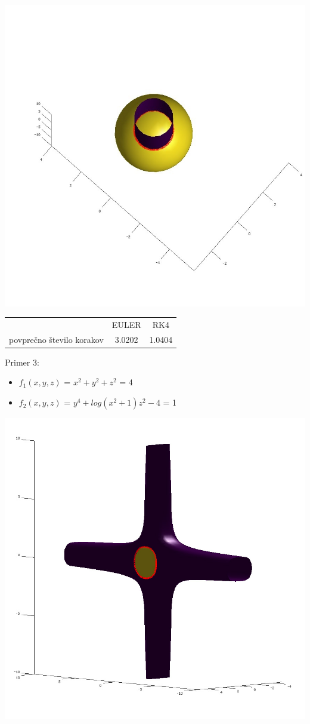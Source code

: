 \documentclass[]{article}
\begin{document}
	\includegraphics[scale=0.3]{primer2_2}
	\begin{center}
	\begin{tabular}{ |c|c|c| } 
 		\hline
 			 & EULER & RK4 \\ 
			povprečno število korakov & 3.0202 & 1.0404 \\ 
 		\hline
 	\end{tabular}
	\end{center}
	Primer 3:
	\begin{itemize}  
		\item $f_{1}(x,y,z)$ = $x^2 + y^2 + z^2$ = 4
		\item $f_{2}(x,y,z)$ = $y^4 + log(x^2 + 1)z^2 - 4$ = 1
	\end{itemize}
	\includegraphics[scale=0.3]{primer3_1}
\end{document}
